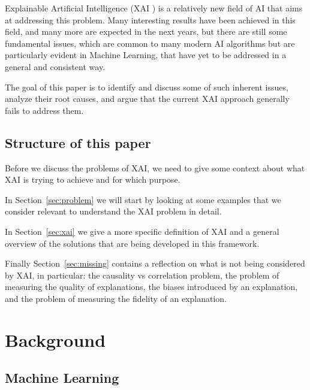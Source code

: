 \documentclass[conference]{IEEEtran}
\newcommand{\cit}{\todo[tickmarkheight=0.2cm]{cit}}
\begin{document}
Explainable Artificial Intelligence (XAI \cit) is a relatively new field of AI that aims at addressing this
problem. Many interesting results have been achieved in this field, and many
more are expected in the next years, but there are still some fundamental
issues, which are common to many modern AI algorithms but are particularly
evident in Machine Learning, that have yet to be addressed in a general and
consistent way.

The goal of this paper is to identify and discuss some of such inherent issues,
analyze their root causes, and argue that the current XAI approach
generally fails to address them.

\subsection{Structure of this paper}
\label{sec:structure}

Before we discuss the problems of XAI, we need to give some context about what
XAI is trying to achieve and for which purpose.

In Section~\ref{sec:problem} we will start by looking at some examples  that we consider relevant to understand the XAI problem in detail.

In Section~\ref{sec:xai} we give a more specific definition of XAI and a general
overview of the solutions that are being developed in this framework.

Finally Section~\ref{sec:missing} contains a reflection on what is not
being considered by XAI, in particular: the causality vs correlation problem,
the problem of measuring the quality of explanations, the biases introduced by
an explanation, and the problem of measuring the fidelity of an explanation.


\section{Background}
\label{sec:background}

\subsection{Machine Learning}
\label{sec:ml}
\end{document}
